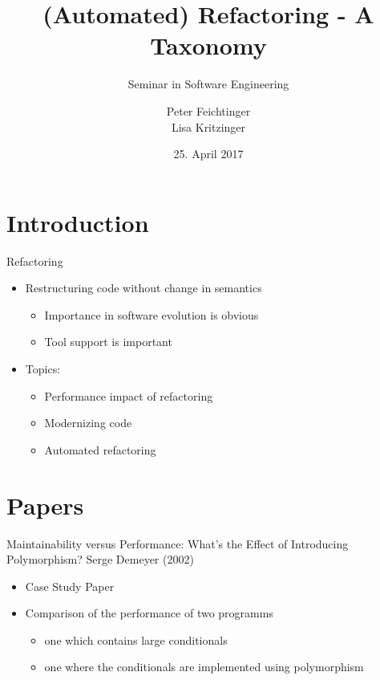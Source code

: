 \documentclass{beamer}
\title[Refactoring]{(Automated) Refactoring - A Taxonomy}
\subtitle{Seminar in Software Engineering}
\institute[]{Institute for Software Systems Engineering\\Johannes Kepler University Linz}
\author[Feichtinger, Kritzinger]{Peter Feichtinger\texorpdfstring{\\}{, }Lisa Kritzinger} %
\date{25. April 2017}
\begin{document}
\begin{frame}
  \titlepage
\end{frame}



\section{Introduction}  %

\begin{frame}{Refactoring}
  \begin{itemize}
    \item Restructuring code without change in semantics
    \begin{itemize}
      \item Importance in software evolution is obvious
      \item Tool support is important
    \end{itemize}
  \end{itemize}
  \pause
  \begin{itemize}
    \item Topics:
    \begin{itemize}
      \item Performance impact of refactoring
      \item Modernizing code
      \item Automated refactoring
    \end{itemize}
  \end{itemize}
\end{frame}

\section{Papers}

\begin{frame}{Maintainability versus Performance: What's the Effect of Introducing Polymorphism?}
  {Serge Demeyer (2002)}
  
  \begin{itemize}
  	\item Case Study Paper
  	\item Comparison of the performance of two programms
  	\begin{itemize}
  		\item one which contains large conditionals
  		\item one where the conditionals are implemented using polymorphism
  	\end{itemize}
  \end{itemize}
\end{frame}
\end{document}
